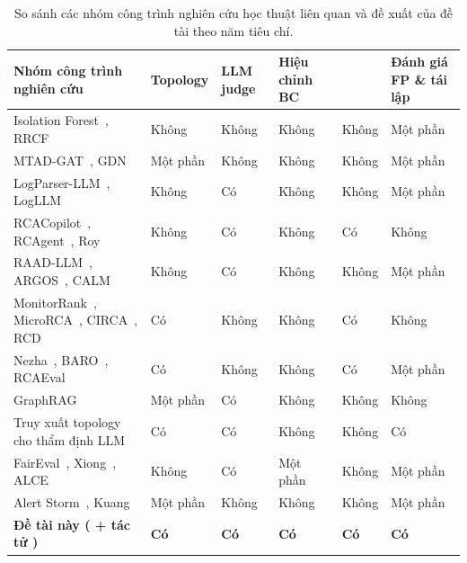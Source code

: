 \begin{table}[H]
  \centering
  \caption[So sánh các nhóm nghiên cứu liên quan và đề xuất của đề tài]{So sánh các nhóm công trình nghiên cứu học thuật liên quan và đề xuất của đề tài theo năm tiêu chí.}
  \label{tab:ch3-so-sanh-nc}
  \tblfont
  \tblsetup
  \setlength{\tabcolsep}{3.5pt}
  \begin{tabularx}{\linewidth}{|Y|>{\centering\arraybackslash}p{1.65cm}|>{\centering\arraybackslash}p{1.45cm}|>{\centering\arraybackslash}p{1.6cm}|>{\centering\arraybackslash}p{1.2cm}|>{\centering\arraybackslash}p{1.65cm}|}
    \hline
    \textbf{Nhóm công trình nghiên cứu} &
    \textbf{Topology} &
    \textbf{LLM judge} &
    \textbf{Hiệu chỉnh BC} &
    \textbf{} &
    \textbf{Đánh giá FP \& tái lập} \\
    \hline
    Isolation Forest~\cite{isof}, RRCF~\cite{guha2016robust} &
      Không & Không & Không & Không & Một phần \\
    \hline
    MTAD-GAT~\cite{zhao2020multivariate}, GDN~\cite{deng2021graph} &
      Một phần & Không & Không & Không & Một phần \\
    \hline
    LogParser-LLM~\cite{zhong2024logparser}, LogLLM~\cite{wang2024logllm} &
      Không & Có & Không & Không & Một phần \\
    \hline
    RCACopilot~\cite{chen2024rcacopilot}, RCAgent~\cite{rcagent2023}, Roy~\cite{roy2024exploring} &
      Không & Có & Không & Có & Không \\
    \hline
    RAAD-LLM~\cite{raad-llm}, ARGOS~\cite{argos}, CALM~\cite{calm} &
      Không & Có & Không & Không & Một phần \\
    \hline
    MonitorRank~\cite{kim2013monitorrank}, MicroRCA~\cite{wu2020microrca}, CIRCA~\cite{li2022circa}, RCD~\cite{ikram2022rcd} &
      Có & Không & Không & Có & Không \\
    \hline
    Nezha~\cite{nezha}, BARO~\cite{pham2024baro}, RCAEval~\cite{pham2025rcaeval} &
      Có & Không & Không & Có & Một phần \\
    \hline
    GraphRAG~\cite{edge2024graphrag} &
      Một phần & Có & Không & Không & Không \\
    \hline
    Truy xuất topology cho thẩm định LLM~\cite{icaetm2026} &
      Có & Có & Không & Không & Có \\
    \hline
    FairEval~\cite{wang2024fair}, Xiong~\cite{xiong2024uncertainty}, ALCE~\cite{gao2023alce} &
      Không & Có & Một phần & Không & Một phần \\
    \hline
    Alert Storm~\cite{zhao2020alertstorm}, Kuang~\cite{kuang2024knowledge} &
      Một phần & Không & Không & Không & Một phần \\
    \hline
    \textbf{Đề tài này (\CTAV{} + tác tử )} &
      \textbf{Có} & \textbf{Có} & \textbf{Có} & \textbf{Có} & \textbf{Có} \\
    \hline
  \end{tabularx}
\end{table}

